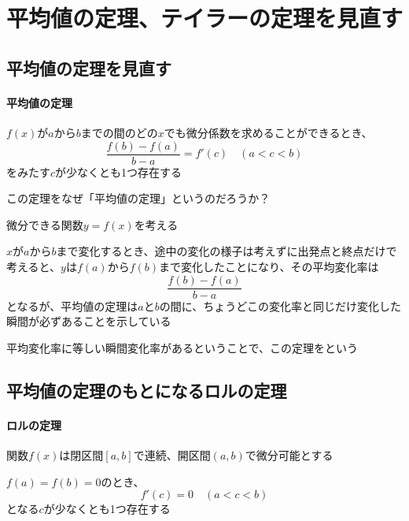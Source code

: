 \documentclass[../book_infinite_continuous_math]{subfiles}
\begin{document}
\section{平均値の定理、テイラーの定理を見直す}

\subsection{平均値の定理を見直す}

\br

\begin{screen}
  \paragraph{平均値の定理}
  $f(x)$が$a$から$b$までの間のどの$x$でも微分係数を求めることができるとき、
  \begin{equation*}
    \frac{f(b) - f(a)}{b - a} = f'(c) \quad (a < c < b)
  \end{equation*}
  をみたす$c$が少なくとも1つ存在する
\end{screen}

\br

この定理をなぜ「平均値の定理」というのだろうか？

微分できる関数$y=f(x)$を考える

$x$が$a$から$b$まで変化するとき、途中の変化の様子は考えずに出発点と終点だけで考えると、$y$は$f(a)$から$f(b)$まで変化したことになり、その平均変化率は
\begin{equation*}
  \frac{f(b) - f(a)}{b - a}
\end{equation*}
となるが、平均値の定理は$a$と$b$の間に、ちょうどこの変化率と同じだけ変化した瞬間が必ずあることを示している

平均変化率に等しい瞬間変化率があるということで、この定理をという

\sectionline
\subsection{平均値の定理のもとになるロルの定理}

\br

\begin{screen}
  \paragraph{ロルの定理}
  関数$f(x)$は閉区間$[a, b]$で連続、開区間$(a, b)$で微分可能とする

  $f(a) = f(b)=0$のとき、
  \begin{equation*}
    f'(c) = 0 \quad (a < c < b)
  \end{equation*}
  となる$c$が少なくとも1つ存在する
\end{screen}
\end{document}
